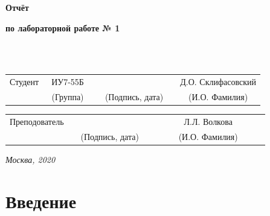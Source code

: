 \documentclass[12pt]{report}
\begin{document}
\begin{titlepage}
		
		\begin{center}
			\vspace{3cm}
			{\bf\huge Отчёт\par}
			{\bf\Large по лабораторной работе № 1\par}
			\vspace{0.5cm}
		\end{center}
		
		
		\noindent
		\\
		
		\noindent
		\\
		
		\vspace{1.5cm}
		\noindent
		\begin{tabular}{l c c c c c}
			Студент      & ~ИУ7-55Б~               & \hspace{3.5cm} & \hspace{3.5cm}                 & &  Д.О. Склифасовский \\\cline{2-2}\cline{4-4} \cline{6-6} 
			\hspace{3cm} & {\footnotesize(Группа)} &                & {\footnotesize(Подпись, дата)} & & {\footnotesize(И.О. Фамилия)}
		\end{tabular}
		
		\vspace{1cm}
		
		\noindent
		\begin{tabular}{l c c c c}
			Преподователь & \hspace{6cm}   & \hspace{3.5cm}                 & & ~~~~~~ Л.Л. Волкова ~~~~~~\\\cline{3-3} \cline{5-5} 
			\hspace{3cm}  &                & {\footnotesize(Подпись, дата)} & & {\footnotesize(И.О. Фамилия)}
		\end{tabular}
		
		\begin{center}	
			\vfill
			\large \textit {Москва, 2020}
		\end{center}
		
		\thispagestyle {empty}
		\pagebreak
	\end{titlepage}
	\restoregeometry
	
	\tableofcontents
	\onehalfspacing
	\newpage
	\chapter*{Введение}
	
\end{document}
